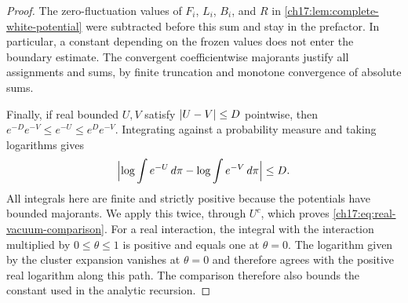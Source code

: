 \begin{proof}
The zero-fluctuation values of $F_i$, $L_i$, $B_i$, and $R$ in \cref{ch17:lem:complete-white-potential} were subtracted before this sum and stay in the prefactor. In particular, a constant depending on the frozen values does not enter the boundary estimate. The convergent coefficientwise majorants justify all assignments and sums, by finite truncation and monotone convergence of absolute sums.

Finally, if real bounded $U,V$ satisfy $\lvert U-V\rvert\le D$ pointwise, then $e^{-D}e^{-V}\le e^{-U}\le e^De^{-V}$. Integrating against a probability measure and taking logarithms gives
\[
 \Bigl\lvert\log\int e^{-U}\,d\pi-\log\int e^{-V}\,d\pi\Bigr\rvert\le D.
\]
All integrals here are finite and strictly positive because the potentials have bounded majorants. We apply this twice, through $U^c$, which proves \eqref{ch17:eq:real-vacuum-comparison}. For a real interaction, the integral with the interaction multiplied by $0\le\theta\le1$ is positive and equals one at $\theta=0$. The logarithm given by the cluster expansion vanishes at $\theta=0$ and therefore agrees with the positive real logarithm along this path. The comparison therefore also bounds the constant used in the analytic recursion.
\end{proof}

